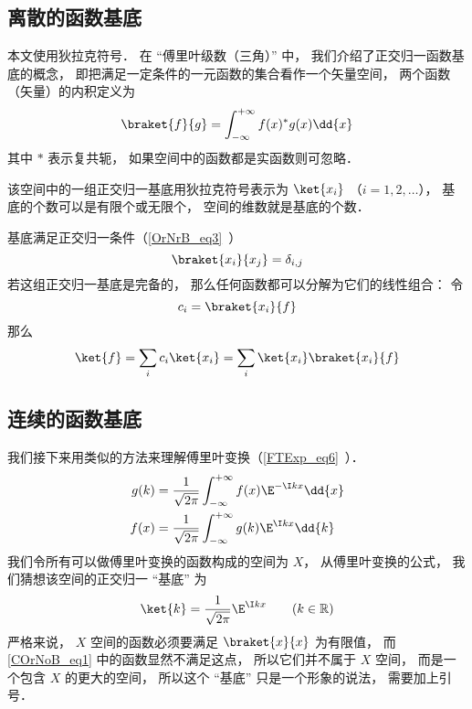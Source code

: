 

\subsection{离散的函数基底}
本文使用狄拉克符号． 在 “傅里叶级数（三角）” 中， 我们介绍了正交归一函数基底的概念， 即把满足一定条件的一元函数的集合看作一个矢量空间， 两个函数（矢量）的内积定义为
\begin{equation}
\braket{f}{g} = \int_{-\infty}^{+\infty} f(x)^* g(x) \dd{x}
\end{equation}
其中 $*$ 表示复共轭， 如果空间中的函数都是实函数则可忽略．

该空间中的一组正交归一基底用狄拉克符号表示为 $\ket{x_i}$ （$i = 1, 2,\dots$）， 基底的个数可以是有限个或无限个， 空间的维数就是基底的个数．

基底满足正交归一条件（\autoref{OrNrB_eq3}~）
\begin{equation}\label{COrNoB_eq2}
\braket{x_i}{x_j} = \delta_{i,j}
\end{equation}
若这组正交归一基底是完备的， 那么任何函数都可以分解为它们的线性组合： 令
\begin{equation}\label{COrNoB_eq5}
c_i = \braket{x_i}{f}
\end{equation}
那么
\begin{equation}\label{COrNoB_eq6}
\ket{f} = \sum_i c_i\ket{x_i} = \sum_i \ket{x_i}\braket{x_i}{f}
\end{equation}

\subsection{连续的函数基底}
我们接下来用类似的方法来理解傅里叶变换（\autoref{FTExp_eq6}~）．
\begin{align}\label{COrNoB_eq4}
g(k) &= \frac{1}{\sqrt{2\pi }} \int_{-\infty }^{+\infty } f(x)\E^{-\I kx} \dd{x} \\
\label{COrNoB_eq3}f(x) &= \frac{1}{\sqrt{2\pi }} \int_{-\infty }^{+\infty } g(k)\E^{\I kx} \dd{k}
\end{align}
我们令所有可以做傅里叶变换的函数构成的空间为 $X$， 从傅里叶变换的公式， 我们猜想该空间的正交归一 “基底” 为
\begin{equation}\label{COrNoB_eq1}
\ket{k} = \frac{1}{\sqrt{2\pi}} \E^{\I kx} \qquad (k \in \mathbb R)
\end{equation}
严格来说， $X$ 空间的函数必须要满足 $\braket{x}{x}$ 为有限值， 而\autoref{COrNoB_eq1} 中的函数显然不满足这点， 所以它们并不属于 $X$ 空间， 而是一个包含 $X$ 的更大的空间， 所以这个 “基底” 只是一个形象的说法， 需要加上引号．

